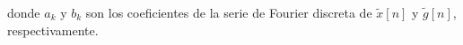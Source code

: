 \documentclass[
  11pt,
  letterpaper,
   addpoints,
   answers
  ]{exam}
\begin{document}
\begin{questions}
\begin{solution}
donde $a_k$ y $b_k$ son los coeficientes de la serie de Fourier discreta de $\tilde{x}[n]$ y $\tilde{g}[n]$, respectivamente.
\end{solution}
%
%
%
%
%
%
%

\end{questions}
\end{document}
